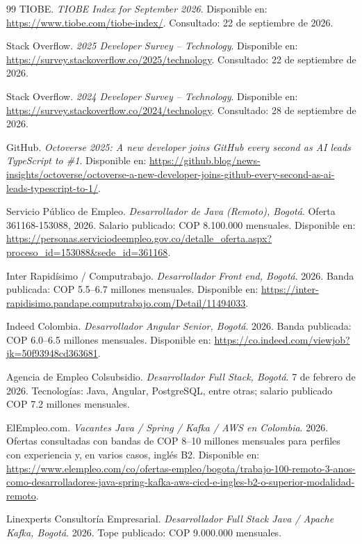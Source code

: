 \documentclass[12pt,a4paper]{article}
\begin{document}
\begin{thebibliography}{99}
TIOBE. \textit{TIOBE Index for September 2026}. Disponible en: \url{https://www.tiobe.com/tiobe-index/}. Consultado: 22 de septiembre de 2026.

Stack Overflow. \textit{2025 Developer Survey -- Technology}. Disponible en: \url{https://survey.stackoverflow.co/2025/technology}. Consultado: 22 de septiembre de 2026.

Stack Overflow. \textit{2024 Developer Survey -- Technology}. Disponible en: \url{https://survey.stackoverflow.co/2024/technology}. Consultado: 28 de septiembre de 2026.

GitHub. \textit{Octoverse 2025: A new developer joins GitHub every second as AI leads TypeScript to \#1}. Disponible en: \url{https://github.blog/news-insights/octoverse/octoverse-a-new-developer-joins-github-every-second-as-ai-leads-typescript-to-1/}.

Servicio Público de Empleo. \textit{Desarrollador de Java (Remoto), Bogotá}. Oferta 361168-153088, 2026. Salario publicado: COP 8.100.000 mensuales. Disponible en: \url{https://personas.serviciodeempleo.gov.co/detalle_oferta.aspx?proceso_id=153088&sede_id=361168}.

Inter Rapidísimo / Computrabajo. \textit{Desarrollador Front end, Bogotá}. 2026. Banda publicada: COP 5.5--6.7 millones mensuales. Disponible en: \url{https://inter-rapidisimo.pandape.computrabajo.com/Detail/11494033}.

Indeed Colombia. \textit{Desarrollador Angular Senior, Bogotá}. 2026. Banda publicada: COP 6.0--6.5 millones mensuales. Disponible en: \url{https://co.indeed.com/viewjob?jk=50f93948cd363681}.

Agencia de Empleo Colsubsidio. \textit{Desarrollador Full Stack, Bogotá}. 7 de febrero de 2026. Tecnologías: Java, Angular, PostgreSQL, entre otras; salario publicado COP 7.2 millones mensuales.

ElEmpleo.com. \textit{Vacantes Java / Spring / Kafka / AWS en Colombia}. 2026. Ofertas consultadas con bandas de COP 8--10 millones mensuales para perfiles con experiencia y, en varios casos, inglés B2. Disponible en: \url{https://www.elempleo.com/co/ofertas-empleo/bogota/trabajo-100-remoto-3-anos-como-desarrolladores-java-spring-kafka-aws-cicd-e-ingles-b2-o-superior-modalidad-remoto}.

Linexperts Consultoría Empresarial. \textit{Desarrollador Full Stack Java / Apache Kafka, Bogotá}. 2026. Tope publicado: COP 9.000.000 mensuales.


\end{thebibliography}
\end{document}
